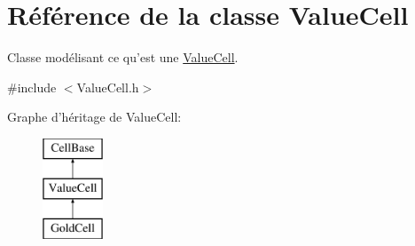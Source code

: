 \hypertarget{class_value_cell}{\section{Référence de la classe Value\-Cell}
\label{class_value_cell}
}


Classe modélisant ce qu'est une \hyperlink{class_value_cell}{Value\-Cell}.  




{\ttfamily \#include $<$Value\-Cell.\-h$>$}

Graphe d'héritage de Value\-Cell\-:\begin{figure}[H]
\begin{center}
\leavevmode
\includegraphics[height=3.000000cm]{class_value_cell}
\end{center}
\end{figure}
